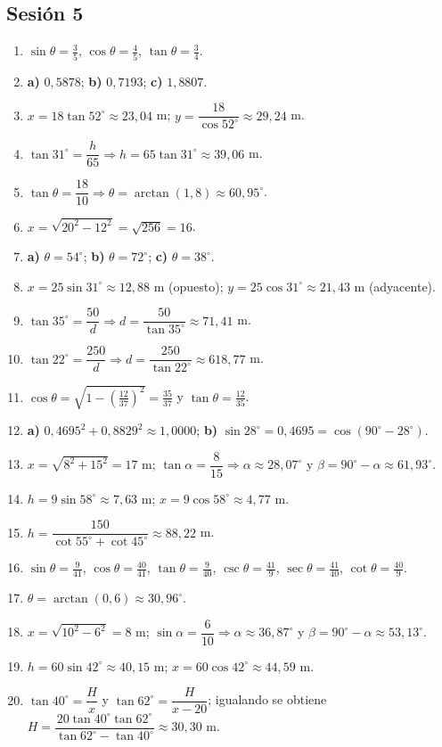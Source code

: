\documentclass[12pt, letterpaper]{article}
\providecommand{\sen}{\sin}
\begin{document}
\subsection*{Sesión 5}
\begin{enumerate}[leftmargin=*, label=\textbf{\arabic*.}]
  \item $\sen\theta=\frac{3}{5}$, $\cos\theta=\frac{4}{5}$, $\tan\theta=\frac{3}{4}$.
  \item \textbf{a)} $0{,}5878$; \quad \textbf{b)} $0{,}7193$; \quad \textbf{c)} $1{,}8807$.
  \item $x=18\tan 52^{\circ}\approx 23{,}04$ m; $y=\dfrac{18}{\cos 52^{\circ}}\approx 29{,}24$ m.
  \item $\tan 31^{\circ}=\dfrac{h}{65}\Rightarrow h=65\tan 31^{\circ}\approx 39{,}06$ m.
  \item $\tan\theta=\dfrac{18}{10}\Rightarrow\theta=\arctan\left(1{,}8\right)\approx 60{,}95^{\circ}$.
  \item $x=\sqrt{20^2-12^2}=\sqrt{256}=16$.
  \item \textbf{a)} $\theta=54^{\circ}$; \quad \textbf{b)} $\theta=72^{\circ}$; \quad \textbf{c)} $\theta=38^{\circ}$.
  \item $x=25\sen 31^{\circ}\approx 12{,}88$ m (opuesto); $y=25\cos 31^{\circ}\approx 21{,}43$ m (adyacente).
  \item $\tan 35^{\circ}=\dfrac{50}{d}\Rightarrow d=\dfrac{50}{\tan 35^{\circ}}\approx 71{,}41$ m.
  \item $\tan 22^{\circ}=\dfrac{250}{d}\Rightarrow d=\dfrac{250}{\tan 22^{\circ}}\approx 618{,}77$ m.
  \item $\cos\theta=\sqrt{1-\left(\frac{12}{37}\right)^2}=\frac{35}{37}$ y $\tan\theta=\frac{12}{35}$.
  \item \textbf{a)} $0{,}4695^2+0{,}8829^2\approx 1{,}0000$; \quad \textbf{b)} $\sen 28^{\circ}=0{,}4695=\cos(90^{\circ}-28^{\circ})$. \checkmark
  \item $x=\sqrt{8^2+15^2}=17$ m; $\tan\alpha=\dfrac{8}{15}\Rightarrow\alpha\approx 28{,}07^{\circ}$ y $\beta=90^{\circ}-\alpha\approx 61{,}93^{\circ}$.
  \item $h=9\sen 58^{\circ}\approx 7{,}63$ m; $x=9\cos 58^{\circ}\approx 4{,}77$ m.
  \item $h=\dfrac{150}{\cot 55^{\circ}+\cot 45^{\circ}}\approx 88{,}22$ m.
  \item $\sen\theta=\frac{9}{41}$, $\cos\theta=\frac{40}{41}$, $\tan\theta=\frac{9}{40}$, $\csc\theta=\frac{41}{9}$, $\sec\theta=\frac{41}{40}$, $\cot\theta=\frac{40}{9}$.
  \item $\theta=\arctan\left(0{,}6\right)\approx 30{,}96^{\circ}$.
  \item $x=\sqrt{10^2-6^2}=8$ m; $\sen\alpha=\dfrac{6}{10}\Rightarrow\alpha\approx 36{,}87^{\circ}$ y $\beta=90^{\circ}-\alpha\approx 53{,}13^{\circ}$.
  \item $h=60\sen 42^{\circ}\approx 40{,}15$ m; $x=60\cos 42^{\circ}\approx 44{,}59$ m.
  \item $\tan 40^{\circ}=\dfrac{H}{x}$ y $\tan 62^{\circ}=\dfrac{H}{x-20}$; igualando se obtiene $H=\dfrac{20\tan 40^{\circ}\tan 62^{\circ}}{\tan 62^{\circ}-\tan 40^{\circ}}\approx 30{,}30$ m.
\end{enumerate}
\end{document}
